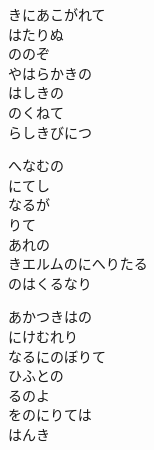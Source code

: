 \documentclass[10pt,b5j]{tarticle} %
\begin{document}
\vspace{1.5em} %
\newcommand{\linespace}{0.5em} %
\newcommand{\blocksize}{0.5\hsize} %
\begin{enumerate} %
    \begin{minipage}[c]{\blocksize}
    
        \vspace{\linespace}
        \item
        きにあこがれて\\
        はたりぬ\\
        ののぞ\\
        やはらかきの\\
        はしきの\\
        のくねて\\
        らしきびにつ
        
        \vspace{\linespace}
        \item
        へなむの\\
        にてし\\
        なるが\\
        りて\\
        あれの\\
        きエルムのにへりたる\\
        のはくるなり
        
        \vspace{\linespace}
        \item
        あかつきはの\\
        にけむれり\\
        なるにのぼりて\\
        ひふとの\\
        るのよ\\
        をのにりては\\
        はんき
        

\end{minipage}
\end{enumerate}
\end{document}
